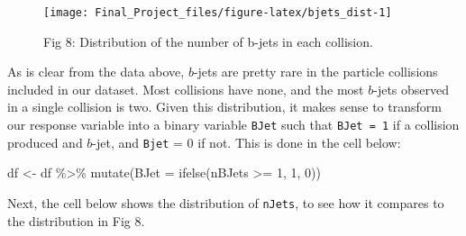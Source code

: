 \documentclass[
]{article}
\newenvironment{Shaded}{\begin{snugshade}}{\end{snugshade}}
\newcommand{\AttributeTok}[1]{\textcolor[rgb]{0.77,0.63,0.00}{#1}}
\newcommand{\DecValTok}[1]{\textcolor[rgb]{0.00,0.00,0.81}{#1}}
\newcommand{\FunctionTok}[1]{\textcolor[rgb]{0.00,0.00,0.00}{#1}}
\newcommand{\NormalTok}[1]{#1}
\newcommand{\OtherTok}[1]{\textcolor[rgb]{0.56,0.35,0.01}{#1}}
\newcommand{\SpecialCharTok}[1]{\textcolor[rgb]{0.00,0.00,0.00}{#1}}
\newcommand{\StringTok}[1]{\textcolor[rgb]{0.31,0.60,0.02}{#1}}
\begin{document}
\begin{Shaded}
\end{Shaded}

\begin{figure}

{\centering \texttt{[image: Final\_Project\_files/figure-latex/bjets\_dist-1]} 

}

\caption{Fig 8: Distribution of the number of b-jets in each collision.}\label{fig:bjets_dist}
\end{figure}

As is clear from the data above, \(b\)-jets are pretty rare in the
particle collisions included in our dataset. Most collisions have none,
and the most \(b\)-jets observed in a single collision is two. Given
this distribution, it makes sense to transform our response variable
into a binary variable \texttt{BJet} such that \texttt{BJet\ =\ 1} if a
collision produced and \(b\)-jet, and \texttt{Bjet} = 0 if not. This is
done in the cell below:

\begin{Shaded}
\begin{Highlighting}[]
\NormalTok{df }\OtherTok{\textless{}{-}}\NormalTok{ df }\SpecialCharTok{\%\textgreater{}\%} 
  \FunctionTok{mutate}\NormalTok{(}\AttributeTok{BJet =} \FunctionTok{ifelse}\NormalTok{(nBJets }\SpecialCharTok{\textgreater{}=} \DecValTok{1}\NormalTok{, }\DecValTok{1}\NormalTok{, }\DecValTok{0}\NormalTok{))}
\end{Highlighting}
\end{Shaded}

Next, the cell below shows the distribution of \texttt{nJets}, to see
how it compares to the distribution in Fig 8.
\end{document}
